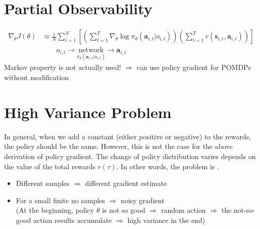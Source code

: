 \section{Partial Observability}
\begin{align*}
	\nabla_\theta J(\theta) & \approx \frac{1}{N} \sum_{i=1}^{N} \left[ \left( \sum_{t=1}^{T} \nabla_\theta\log \pi_\theta(\textbf{a}_{i,t} | o_{i,t}) \right) \left( \sum_{t=1}^{T} r(\textbf{s}_{i,t}, \textbf{a}_{i,t}) \right) \right]\\
	& \qquad o_{i, t} \rightarrow \underset{\pi_\theta(\textbf{a}_{i,t} | o_{i,t})}{\text{network}} \rightarrow \textbf{a}_{i,t}
\end{align*}
Markov property is not actually used! $\Rightarrow$ can use policy gradient for \ac{POMDP}s without modification

\section{High Variance Problem}
In general, when we add a constant (either positive or negative) to the rewards, the policy should be the same. However, this is not the case for the above derivation of policy gradient. The change of policy distribution varies depends on the value of the total rewards $r(\tau)$. In other words, the problem is .
\begin{itemize}
	\item Different samples $\Rightarrow$ different gradient estimate
	\item For a small finite \ac{no} samples $\Rightarrow$ noisy gradient\\
	(At the beginning, policy $\theta$ is not so good $\Rightarrow$ random action $\Rightarrow$ the not-so-good action results accumulate $\Rightarrow$ high variance in the end)
\end{itemize}

